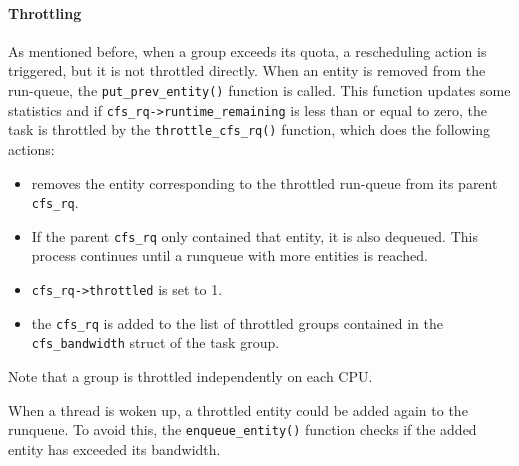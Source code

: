 \paragraph{Throttling}
As mentioned before, when a group exceeds its quota, a rescheduling action is triggered, but it is not throttled directly. When an entity is removed from the run-queue, the \verb|put_prev_entity()| function is called. This function updates some statistics and if \verb|cfs_rq->runtime_remaining| is less than or equal to zero, the task is throttled by the \verb|throttle_cfs_rq()| function, which does the following actions:
\begin{itemize}
    \item removes the entity corresponding to the throttled run-queue from its parent \verb|cfs_rq|.
    \item If the parent \verb|cfs_rq| only contained that entity, it is also dequeued. This process continues until a runqueue with more entities is reached.
    \item \verb|cfs_rq->throttled| is set to 1.
    \item the \verb|cfs_rq| is added to the list of throttled groups contained in the \verb|cfs_bandwidth| struct of the task group.
\end{itemize}
Note that a group is throttled independently on each CPU.

When a thread is woken up, a throttled entity could be added again to the runqueue. To avoid this, the \verb|enqueue_entity()| function checks if the added entity has exceeded its bandwidth.

